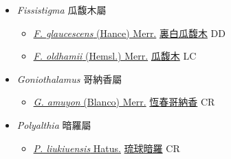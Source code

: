 
  \begin{itemize}
 \item[] \textit{Fissistigma} 瓜馥木屬
                    
  \begin{itemize}
        \item[] \href{http://www.theplantlist.org/tpl1.1/search?q=Fissistigma+glaucescens}{\textit{F. glaucescens} (Hance) Merr.}   \href{\detokenize{http://taibnet.sinica.edu.tw/chi/taibnet_species_list.php?T2=裏白瓜馥木&T2_new_value=true&fr=y}}{裏白瓜馥木} DD
        \item[] \href{http://www.theplantlist.org/tpl1.1/search?q=Fissistigma+oldhamii}{\textit{F. oldhamii} (Hemsl.) Merr.}   \href{\detokenize{http://taibnet.sinica.edu.tw/chi/taibnet_species_list.php?T2=瓜馥木&T2_new_value=true&fr=y}}{瓜馥木} LC
  \end{itemize}
 \item[] \textit{Goniothalamus} 哥納香屬
                    
  \begin{itemize}
        \item[] \href{http://www.theplantlist.org/tpl1.1/search?q=Goniothalamus+amuyon}{\textit{G. amuyon} (Blanco) Merr.}   \href{\detokenize{http://taibnet.sinica.edu.tw/chi/taibnet_species_list.php?T2=恆春哥納香&T2_new_value=true&fr=y}}{恆春哥納香} CR
  \end{itemize}
 \item[] \textit{Polyalthia} 暗羅屬
                    
  \begin{itemize}
        \item[] \href{http://www.theplantlist.org/tpl1.1/search?q=Polyalthia+liukiuensis}{\textit{P. liukiuensis} Hatus.}   \href{\detokenize{http://taibnet.sinica.edu.tw/chi/taibnet_species_list.php?T2=琉球暗羅&T2_new_value=true&fr=y}}{琉球暗羅} CR
  \end{itemize}
  \end{itemize}

